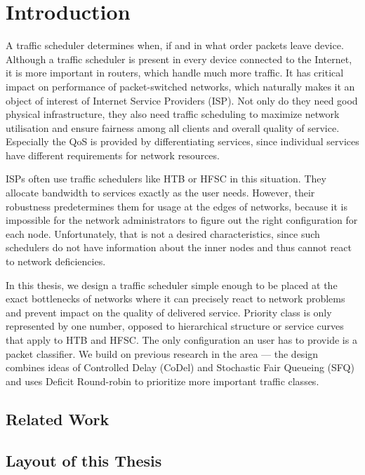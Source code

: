 \chapter*{Introduction}

A traffic scheduler determines when, if and in what order packets leave device. Although a traffic scheduler is present in every device connected to the Internet, it is more important in routers, which handle much more traffic. It has critical impact on performance of packet-switched networks, which naturally makes it an object of interest of Internet Service Providers (ISP).  Not only do they need good physical infrastructure, they also need traffic scheduling to maximize network utilisation and ensure fairness among all clients and overall quality of service. Especially the QoS is provided by differentiating services, since individual services have different requirements for network resources.

ISPs often use traffic schedulers like HTB or HFSC in this situation. They allocate bandwidth to services exactly as the user needs. However, their robustness predetermines them for usage at the edges of networks, because it is impossible for the network administrators to figure out the right configuration for each node. Unfortunately, that is not a desired characteristics, since such schedulers do not have information about the inner nodes and thus cannot react to network deficiencies.

In this thesis, we design a traffic scheduler simple enough to be placed at the exact bottlenecks of networks where it can precisely react to network problems and prevent impact on the quality of delivered service. Priority class is only represented by one number, opposed to hierarchical structure or service curves that apply to HTB and HFSC. The only configuration an user has to provide is a packet classifier. We build on previous research in the area --- the design combines ideas of Controlled Delay (CoDel) and Stochastic Fair Queueing (SFQ) and uses Deficit Round-robin to prioritize more important traffic classes. 


\section*{Related Work}


\section*{Layout of this Thesis}


